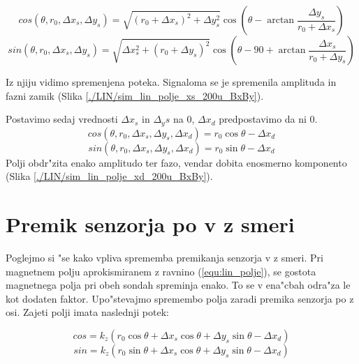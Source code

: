 \begin{equation}
\label{equ:Bx_stat}
cos(\theta,r_0,\Delta x_s, \Delta y_s)= \sqrt{(r_0+\Delta x_s)^2+\Delta y_s^2}\cos(\theta -\arctan \frac{\Delta y_s}{r_0+\Delta x_s})
\end{equation}
\begin{equation}\label{equ:By_stat}
sin(\theta,r_0,\Delta x_s, \Delta y_s)= \sqrt{\Delta x_s^2+(r_0+\Delta y_s)^2} \cos(\theta - 90 +\arctan \frac{\Delta x_s}{r_0+\Delta y_s})
\end{equation}

Iz njiju vidimo spremenjena poteka. Signaloma se je spremenila amplituda in fazni zamik (Slika \ref{./LIN/sim_lin_polje_xs_200u_BxBy}).


Postavimo sedaj vrednosti $\Delta x_s$ in $\Delta_ys$ na 0, $\Delta x_d$ predpostavimo da ni 0.
\begin{equation}
\label{equ:Bx_din}
cos(\theta,r_0,\Delta x_s, \Delta y_s, \Delta x_d)= r_0 \cos\theta-\Delta x_d
\end{equation}
\begin{equation}
\label{equ:By_din}
sin(\theta,r_0,\Delta x_s, \Delta y_s, \Delta x_d)= r_0 \sin\theta-\Delta x_d
\end{equation}
Polji obdr"zita enako amplitudo ter fazo, vendar dobita enosmerno komponento (Slika \ref{./LIN/sim_lin_polje_xd_200u_BxBy}).





\section{Premik senzorja po  v z smeri}

Poglejmo si "se kako vpliva sprememba premikanja senzorja v z smeri.
Pri magnetnem polju aprokismiranem z ravnino (\ref{equ:lin_polje}), se gostota magnetnega polja pri obeh sondah spreminja enako. To se v ena"cbah odra"za le kot dodaten faktor. Upo"stevajmo spremembo polja zaradi premika senzorja po z osi. Zajeti polji imata naslednji potek:


\begin{equation}\label{equ:Bx_z}
cos=k_z( r_0 \cos\theta +\Delta x_s \cos\theta +\Delta y_s \sin\theta -\Delta x_d)
\end{equation}
\begin{equation}\label{equ:By_z}
sin=k_z( r_0 \sin\theta +\Delta x_s \cos\theta +\Delta y_s \sin\theta-\Delta x_d)
\end{equation}

